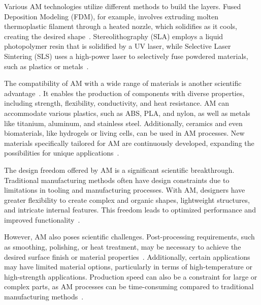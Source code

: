 Various AM technologies utilize different methods to build the layers. Fused Deposition Modeling (FDM), for example, involves extruding molten thermoplastic filament through a heated nozzle, which solidifies as it cools, creating the desired shape~\cite{Wickramasinghe.2020}. Stereolithography (SLA) employs a liquid photopolymer resin that is solidified by a UV laser, while Selective Laser Sintering (SLS) uses a high-power laser to selectively fuse powdered materials, such as plastics or metals~\cite{Wang.2016, Meier.2017}.

The compatibility of AM with a wide range of materials is another scientific advantage~\cite{Bose.2018}. It enables the production of components with diverse properties, including strength, flexibility, conductivity, and heat resistance. AM can accommodate various plastics, such as ABS, PLA, and nylon, as well as metals like titanium, aluminum, and stainless steel. Additionally, ceramics and even biomaterials, like hydrogels or living cells, can be used in AM processes. New materials specifically tailored for AM are continuously developed,  expanding the possibilities for unique applications~\cite{Attaran.2017}.

The design freedom offered by AM is a significant scientific breakthrough. Traditional manufacturing methods often have design constraints due to limitations in tooling and manufacturing processes. With AM, designers have greater flexibility to create complex and organic shapes, lightweight structures, and intricate internal features. This freedom leads to optimized performance and improved functionality~\cite{Plocher.2019}.

However, AM also poses scientific challenges. Post-processing requirements, such as smoothing, polishing, or heat treatment, may be necessary to achieve the desired surface finish or material properties~\cite{Jandyal.2022}. Additionally, certain applications may have limited material options, particularly in terms of high-temperature or high-strength applications. Production speed can also be a constraint for large or complex parts, as AM processes can be time-consuming compared to traditional manufacturing methods~\cite{Dilberoglu.2017}.


